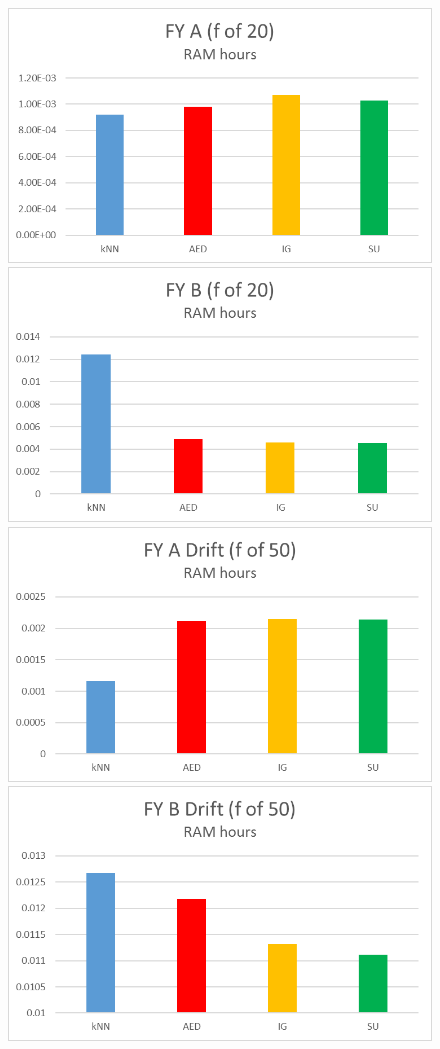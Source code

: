 \begin{figure}[hp]
\includegraphics[scale=0.17]{Graphs/FY_A/mem20}
\includegraphics[scale=0.17]{Graphs/FY_B/mem20}
\includegraphics[scale=0.17]{Graphs/FY_A_Drift/mem}
\includegraphics[scale=0.17]{Graphs/FY_B_Drift/mem}

\end{figure}
